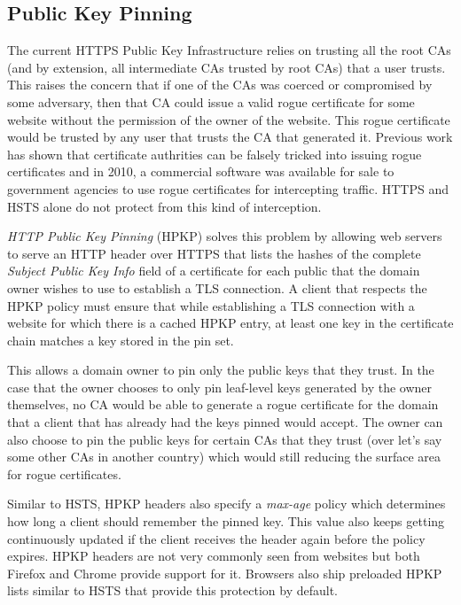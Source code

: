\subsection{Public Key Pinning}
The current HTTPS Public Key Infrastructure relies on trusting all the root CAs
(and by extension, all intermediate CAs trusted by root CAs) that a user
trusts. This raises the concern that if one of the CAs was coerced or
compromised by some adversary, then that CA could issue a valid rogue
certificate for some website without the permission of the owner of the
website. This rogue certificate would be trusted by any user that trusts the CA
that generated it. Previous work has shown that certificate authrities can be
falsely tricked into issuing rogue certificates and in 2010, a commercial
software was available for sale to government agencies to use rogue
certificates for intercepting traffic. HTTPS and HSTS alone do not protect from
this kind of interception.

\emph{HTTP Public Key Pinning} (HPKP) solves this problem by allowing web
servers to serve an HTTP header over HTTPS that lists the hashes of the
complete \emph{Subject Public Key Info} field of a certificate for each public
that the domain owner wishes to use to establish a TLS connection. A client
that respects the HPKP policy must ensure that while establishing a TLS
connection with a website for which there is a cached HPKP entry, at least one
key in the certificate chain matches a key stored in the pin set.

This allows a domain owner to pin only the public keys that they trust. In the
case that the owner chooses to only pin leaf-level keys generated by the owner
themselves, no CA would be able to generate a rogue certificate for the domain
that a client that has already had the keys pinned would accept. The owner can
also choose to pin the public keys for certain CAs that they trust (over let's
say some other CAs in another country) which would still reducing the surface
area for rogue certificates.

Similar to HSTS, HPKP headers also specify a \emph{max-age} policy which
determines how long a client should remember the pinned key. This value also
keeps getting continuously updated if the client receives the header again
before the policy expires. HPKP headers are not very commonly seen from
websites but both Firefox and Chrome provide support for it. Browsers also
ship preloaded HPKP lists similar to HSTS that provide this protection
by default.

